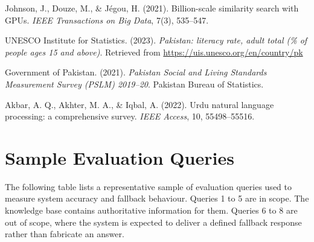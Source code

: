 \documentclass[12pt,a4paper]{report}
\renewcommand{\thesection}{\arabic{section}}
\begin{document}
\begin{flushleft}
Johnson, J., Douze, M., \& J{\'e}gou, H. (2021). Billion-scale similarity
search with GPUs. \textit{IEEE Transactions on Big Data}, 7(3),
535--547.

\vspace{0.5em}

UNESCO Institute for Statistics. (2023). \textit{Pakistan: literacy
rate, adult total (\% of people ages 15 and above)}. Retrieved from
\url{https://uis.unesco.org/en/country/pk}

\vspace{0.5em}

Government of Pakistan. (2021). \textit{Pakistan Social and Living
Standards Measurement Survey (PSLM) 2019--20}. Pakistan Bureau of
Statistics.

\vspace{0.5em}

Akbar, A. Q., Akhter, M. A., \& Iqbal, A. (2022). Urdu natural language
processing: a comprehensive survey. \textit{IEEE Access}, 10,
55498--55516.

\end{flushleft}

\newpage
\appendix
\renewcommand{\thesection}{Appendix \Alph{section}}

\section{Sample Evaluation Queries}
\label{app:queries}

The following table lists a representative sample of evaluation queries
used to measure system accuracy and fallback behaviour. Queries 1 to 5
are in scope. The knowledge base contains authoritative information for
them. Queries 6 to 8 are out of scope, where the system is expected to
deliver a defined fallback response rather than fabricate an answer.
\end{document}
